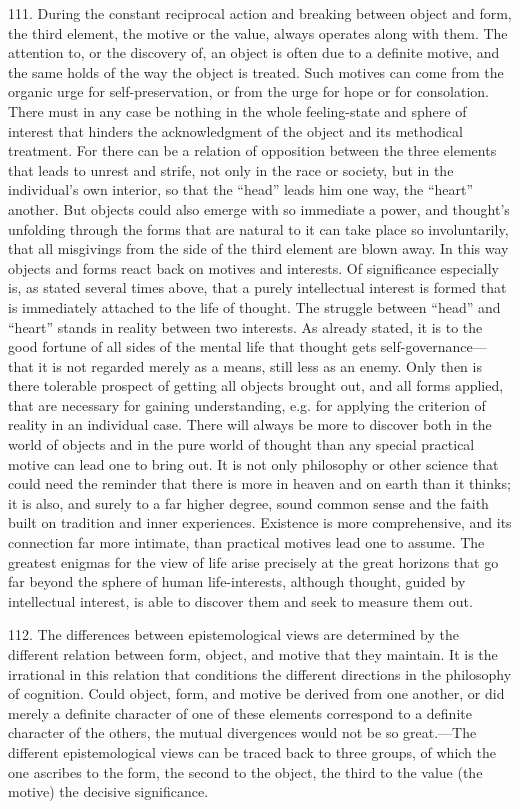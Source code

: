 \documentclass[12pt,a4paper]{book}
\newcommand{\opage}[1]{\marginnote{\footnotesize\textit{[#1]}}}
\begin{document}
111. During the constant reciprocal action and breaking between object and
form, the third element, the motive or the value, always operates along with
them. The attention to, or the discovery of, an object is often due to a
definite motive, and the same holds of the way the object is treated. Such
motives can come from the organic urge for self-preservation, or from the urge
for hope or for consolation. There must in any case be nothing in the whole
feeling-state and sphere of interest that hinders the acknowledgment of the
object and its methodical treatment. For there can be a relation of opposition
between the three elements that leads to unrest and strife, not only in the
race or society, but in the individual's own interior, so that the ``head''
leads him one way, the ``heart'' another. But objects could also emerge with so
immediate a power, and thought's unfolding through the forms that are natural
to it can take place so involuntarily, that all misgivings from the side of the
third element are blown away. In this way objects and forms react back on
motives and interests. Of significance especially is, as stated several times
above, that a purely intellectual interest is formed that is immediately
attached to the life of thought. The struggle between ``head'' and ``heart''
stands in reality between two interests. As already stated, it is to the good
fortune of all sides of the mental life that thought gets self-governance---that
it is not regarded merely as a means, still less as an enemy. Only then is
there tolerable prospect of getting all objects brought out, and all forms
applied, that are necessary \opage{265}for gaining understanding, e.g. for applying the
criterion of reality in an individual case. There will always be more to
discover both in the world of objects and in the pure world of thought than any
special practical motive can lead one to bring out. It is not only philosophy or
other science that could need the reminder that there is more in heaven and on
earth than it thinks; it is also, and surely to a far higher degree, sound
common sense and the faith built on tradition and inner experiences. Existence
is more comprehensive, and its connection far more intimate, than practical
motives lead one to assume. The greatest enigmas for the view of life arise
precisely at the great horizons that go far beyond the sphere of human
life-interests, although thought, guided by intellectual interest, is able to
discover them and seek to measure them out.

112. The differences between epistemological views are determined by the
different relation between form, object, and motive that they maintain. It is
the irrational in this relation that conditions the different directions in the
philosophy of cognition. Could object, form, and motive be derived from one
another, or did merely a definite character of one of these elements
correspond to a definite character of the others, the mutual divergences would
not be so great.---The different epistemological views can be traced back to
three groups, of which the one ascribes to the form, the second to the object,
the third to the value (the motive) the decisive significance.
\end{document}
